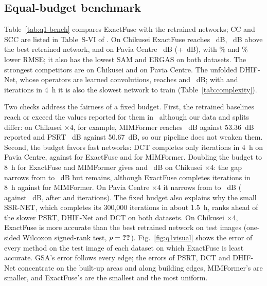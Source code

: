 \documentclass[journal]{IEEEtran}
\begin{document}
\subsection{Equal-budget benchmark}
\label{sec:bench}
Table~\ref{tab:q1-bench} compares ExactFuse with the  retrained networks; CC and SCC are listed in Table~S-VI of \supp. On Chikusei ExactFuse reaches ~dB, ~dB above the best retrained network, and on Pavia Centre ~dB (+~dB), with \% and \% lower RMSE; it also has the lowest SAM and ERGAS on both datasets. The strongest competitors are  on Chikusei and  on Pavia Centre. The unfolded DHIF-Net, whose operators are learned convolutions, reaches  and ~dB; with  and  iterations in 4~h it is also the slowest network to train (Table~\ref{tab:complexity}).

Two checks address the fairness of a fixed budget. First, the retrained baselines reach or exceed the values reported for them in~\cite{chen2026twostage} although our data and splits differ: on Chikusei $\times$4, for example, MIMFormer reaches ~dB against 53.36~dB reported and PSRT ~dB against 50.67~dB, so our pipeline does not weaken them. Second, the budget favors fast networks: DCT completes only  iterations in 4~h on Pavia Centre, against  for ExactFuse and  for MIMFormer. Doubling the budget to 8~h for ExactFuse and MIMFormer gives  and ~dB on Chikusei $\times$4: the gap narrows from  to ~dB but remains, although ExactFuse completes  iterations in 8~h against  for MIMFormer. On Pavia Centre $\times$4 it narrows from  to ~dB ( against ~dB, after  and  iterations). The fixed budget also explains why the small SSR-NET, which completes its 300{,}000 iterations in about 1.5~h, ranks ahead of the slower PSRT, DHIF-Net and DCT on both datasets. On Chikusei $\times$4, ExactFuse is more accurate than the best retrained network on  test images (one-sided Wilcoxon signed-rank test, $p=\qone{chikusei4-p}$). Fig.~\ref{fig:q1visual} shows the error of every method on the test image of each dataset on which ExactFuse is least accurate. GSA's error follows every edge; the errors of PSRT, DCT and DHIF-Net concentrate on the built-up areas and along building edges, MIMFormer's are smaller, and ExactFuse's are the smallest and the most uniform.
\end{document}
